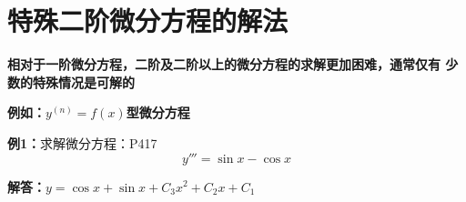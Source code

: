 
\section{特殊二阶微分方程的解法}

\begin{frame}
	\linespread{1.2}
	\alert{\bf 相对于一阶微分方程，二阶及二阶以上的微分方程的求解更加困难，通常仅有
	少数的特殊情况是可解的}\pause 
	
	\bigskip
	{\bf 例如：$y^{(n)}=f(x)$型微分方程}\pause 
	\begin{exampleblock}{{\bf 例1：}求解微分方程：\hfill P417}
		$$y'''=\sin x-\cos x$$
	\end{exampleblock}
	\pause 
	{\bf 解答：}$y=\cos x+\sin x+C_3x^2+C_2x+C_1$
\end{frame}

